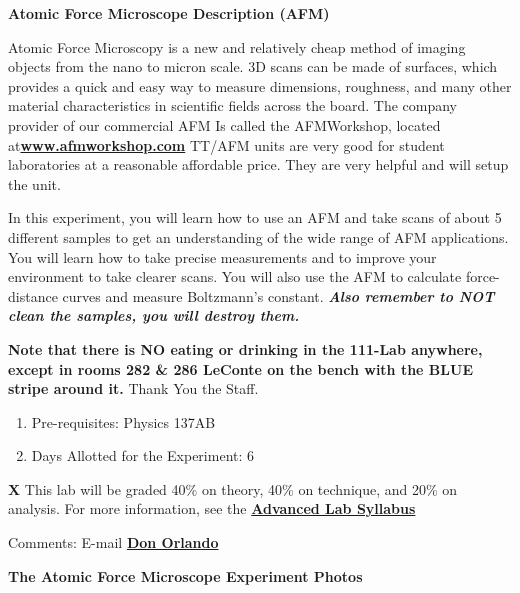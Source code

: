 \documentclass{../lab}
\begin{document}
\maketitle

\tableofcontents

\textbf{Atomic Force Microscope Description (AFM)}

Atomic Force Microscopy is a new and relatively cheap method of imaging objects from the nano to micron scale.  3D scans can be made of surfaces, which provides a quick and easy way to measure dimensions, roughness, and many other material characteristics in scientific fields across the board. The company provider of our commercial AFM Is called the AFMWorkshop, located at\href{http://www.afmworkshop.com/}{\textbf{www.afmworkshop.com}} TT/AFM units are very good for student laboratories at a reasonable affordable price. They are very helpful and will setup the unit.

In this experiment, you will learn how to use an AFM and take scans of about 5 different samples to get an understanding of the wide range of AFM applications. You will learn how to take precise measurements and to improve your environment to take clearer scans. You will also use the AFM to calculate force-distance curves and measure Boltzmann's constant. \emph{\textbf{Also remember to NOT clean the samples, you will destroy them.}}

\textbf{Note that there is NO eating or drinking in the 111-Lab anywhere, except in rooms 282 \& 286 LeConte on the bench with the BLUE stripe around it.} Thank You the Staff.

\begin{enumerate}
    \item Pre-requisites: Physics 137AB

    \item Days Allotted for the Experiment: 6

\end{enumerate}

\textbf{X} This lab will be graded 40\% on theory, 40\% on technique, and 20\% on analysis. For more information, see the \href{http://experimentationlab.berkeley.edusyllabus}{\textbf{Advanced Lab Syllabus}}

Comments: E-mail\textbf{ }\href{\MailDonOrlando}{\textbf{\textbf{Don Orlando}}}

\textbf{The Atomic Force Microscope Experiment Photos}
\end{document}
